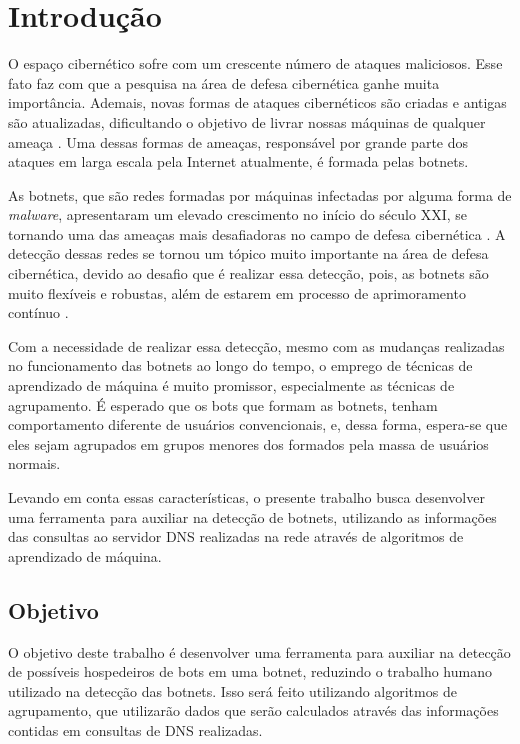 \chapter{Introdução}
O espaço cibernético sofre com um crescente número de ataques maliciosos. Esse fato faz com que a pesquisa na área de defesa cibernética ganhe muita importância. Ademais, novas formas de ataques cibernéticos são criadas e antigas são atualizadas, dificultando o objetivo de livrar nossas máquinas de qualquer ameaça \citep{bharathula2016equitable}. Uma dessas formas de ameaças, responsável por grande parte dos ataques em larga escala pela Internet atualmente, é formada pelas botnets.

As botnets, que são redes formadas por máquinas infectadas por alguma forma de \textit{malware}, apresentaram um elevado crescimento no início do século XXI, se tornando uma das ameaças mais desafiadoras no campo de defesa cibernética \citep{chang2015measuring}. A detecção dessas redes se tornou um tópico muito importante na área de defesa cibernética, devido ao desafio que é realizar essa detecção, pois, as botnets são muito flexíveis e robustas, além de estarem em processo de aprimoramento contínuo \citep{bu2010new}.

Com a necessidade de realizar essa detecção, mesmo com as mudanças realizadas no funcionamento das botnets ao longo do tempo, o emprego de técnicas de aprendizado de máquina é muito promissor, especialmente as técnicas de agrupamento. É esperado que os bots que formam as botnets, tenham comportamento diferente de usuários convencionais, e, dessa forma, espera-se que eles sejam agrupados em grupos menores dos formados pela massa de usuários normais.

Levando em conta essas características, o presente trabalho busca desenvolver uma ferramenta para auxiliar na detecção de botnets, utilizando as informações das consultas ao servidor DNS realizadas na rede através de algoritmos de aprendizado de máquina.

\section{Objetivo}
O objetivo deste trabalho é desenvolver uma ferramenta para auxiliar na detecção de possíveis hospedeiros de bots em uma botnet, reduzindo o trabalho humano utilizado na detecção das botnets. Isso será feito utilizando algoritmos de agrupamento, que utilizarão dados que serão calculados através das informações contidas em consultas de DNS realizadas. 

